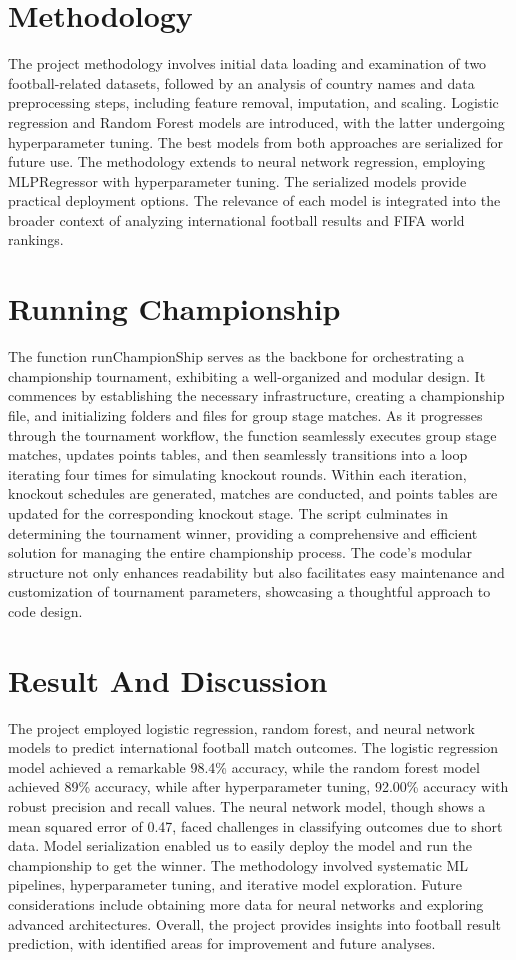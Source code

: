 \documentclass[letterpaper]{article}
\begin{document}
	\section*{Methodology}
		The project methodology involves initial data loading and examination of two football-related datasets, followed by an analysis of country names and data preprocessing steps, including feature removal, imputation, and scaling. Logistic regression and Random Forest models are introduced, with the latter undergoing hyperparameter tuning. The best models from both approaches are serialized for future use. The methodology extends to neural network regression, employing MLPRegressor with hyperparameter tuning. The serialized models provide practical deployment options. The relevance of each model is integrated into the broader context of analyzing international football results and FIFA world rankings.
		
	\section*{Running Championship}
		The function runChampionShip serves as the backbone for orchestrating a championship tournament, exhibiting a well-organized and modular design. It commences by establishing the necessary infrastructure, creating a championship file, and initializing folders and files for group stage matches. As it progresses through the tournament workflow, the function seamlessly executes group stage matches, updates points tables, and then seamlessly transitions into a loop iterating four times for simulating knockout rounds. Within each iteration, knockout schedules are generated, matches are conducted, and points tables are updated for the corresponding knockout stage. The script culminates in determining the tournament winner, providing a comprehensive and efficient solution for managing the entire championship process. The code's modular structure not only enhances readability but also facilitates easy maintenance and customization of tournament parameters, showcasing a thoughtful approach to code design.
		\section*{Result And Discussion}
		The project employed logistic regression, random forest, and neural network models to predict international football match outcomes. The logistic regression model achieved a remarkable 98.4\% accuracy, while the random forest model  achieved 89\% accuracy, while after hyperparameter tuning, 92.00\% accuracy with robust precision and recall values. The neural network model, though shows a mean squared error of 0.47, faced challenges in classifying outcomes due to short data. Model serialization enabled us to easily deploy the model and run the championship to get the winner. The methodology involved systematic ML pipelines, hyperparameter tuning, and iterative model exploration. Future considerations include obtaining more data for neural networks and exploring advanced architectures. Overall, the project provides insights into football result prediction, with identified areas for improvement and future analyses.
\end{document}
